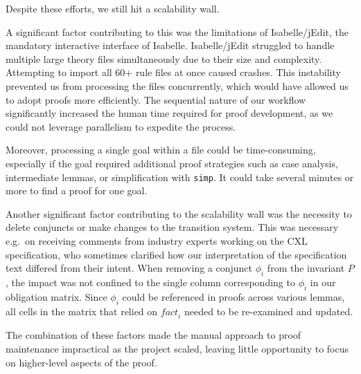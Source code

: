\documentclass[10pt,conference]{IEEEtran}
\newcommand\simp{\texttt{simp}}
\begin{document}


Despite these efforts, we still hit a scalability wall. 

A significant factor contributing to this was the limitations of Isabelle/jEdit, the mandatory interactive interface of Isabelle. Isabelle/jEdit struggled to handle multiple large theory files simultaneously due to their size and complexity. Attempting to import all 60+ rule files at once caused crashes. This instability prevented us from processing the files concurrently, which would have allowed us to adopt \sledgehammer{} proofs more efficiently. The sequential nature of our workflow significantly increased the human time required for proof development, as we could not leverage parallelism to expedite the process.

Moreover, processing a single goal within a file could be time-consuming, especially if the goal required additional proof strategies such as case analysis, intermediate lemmas, or simplification with \simp{}. It could take several minutes or more to find a proof for one goal.

Another significant factor contributing to the scalability wall was the necessity to delete conjuncts or make changes to the transition system.
This was necessary e.g.\ on receiving comments from industry experts working on the CXL specification, who sometimes clarified how our interpretation of the specification text differed from their intent. When removing a conjunct $\phi_i$ from the invariant $P$, the impact was not confined to the single column corresponding to $\phi_i$ in our obligation matrix. Since $\phi_i$ could be referenced in proofs across various lemmas, all cells in the matrix that relied on $\textit{fact}_i$ needed to be re-examined and updated.

The combination of these factors made the manual approach to proof maintenance impractical as the project scaled,
leaving little opportunity to focus on higher-level aspects of the proof.
\end{document}
